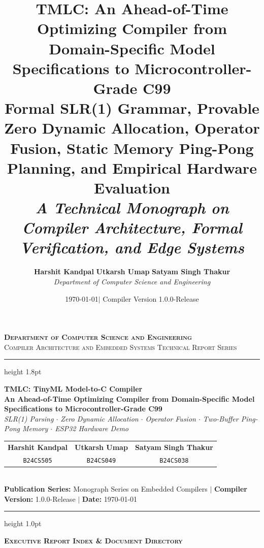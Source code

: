 \documentclass[11pt,a4paper]{article}
\title{
    \vspace{-1.5cm}
    \textbf{\huge TMLC: An Ahead-of-Time Optimizing Compiler from Domain-Specific Model Specifications to Microcontroller-Grade C99} \\[0.6em]
    \large\textbf{Formal SLR(1) Grammar, Provable Zero Dynamic Allocation, Operator Fusion, Static Memory Ping-Pong Planning, and Empirical Hardware Evaluation} \\[0.4em]
    \normalsize\textit{A Technical Monograph on Compiler Architecture, Formal Verification, and Edge Systems}
}
\author{
    \textbf{Harshit Kandpal} \qquad \textbf{Utkarsh Umap} \qquad \textbf{Satyam Singh Thakur} \\[0.4em]
    \textit{Department of Computer Science and Engineering}
}
\date{\today \quad $\vert$ \quad Compiler Version 1.0.0-Release}
\begin{document}
\begin{titlepage}
\thispagestyle{empty}
\begin{center}
    {\large \textsc{\textbf{Department of Computer Science and Engineering}}}\\[0.25em]
    {\normalsize \textsc{Compiler Architecture and Embedded Systems Technical Report Series}}\\[0.6em]
    \hrule height 1.8pt
    \vspace{0.8em}
    
    {\Huge \textbf{TMLC: TinyML Model-to-C Compiler}}\\[0.45em]
    {\large \textbf{An Ahead-of-Time Optimizing Compiler from Domain-Specific Model Specifications to Microcontroller-Grade C99}}\\[0.35em]
    {\small \textit{SLR(1) Parsing $\cdot$ Zero Dynamic Allocation $\cdot$ Operator Fusion $\cdot$ Two-Buffer Ping-Pong Memory $\cdot$ ESP32 Hardware Demo}}\\[1.1em]
    
    \begin{tabular}{ccc}
        \textbf{Harshit Kandpal} & \textbf{Utkarsh Umap} & \textbf{Satyam Singh Thakur} \\
        \texttt{B24CS505} & \texttt{B24CS049} & \texttt{B24CS038} \\
    \end{tabular}\\[0.65em]
    {\footnotesize \textbf{Publication Series:} Monograph Series on Embedded Compilers \quad $\vert$ \quad \textbf{Compiler Version:} 1.0.0-Release \quad $\vert$ \quad \textbf{Date:} \today}
\end{center}

\vspace{0.5em}
\hrule height 1.0pt
\vspace{0.8em}

\begin{center}
    {\large \textbf{\textsc{Executive Report Index \& Document Directory}}}
\end{center}
\vspace{0.2em}


\end{titlepage}
\end{document}
